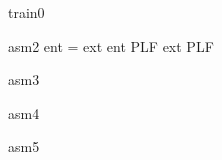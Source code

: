 \documentclass[12pt]{amsart}
\begin{document}
\begin{machine}{train0}
\begin{assumption}{asm2}
	\neg ent = ext \land \neg ent \in PLF \land \neg ext \in PLF
\end{assumption}

\begin{assumption}{asm3}
\end{assumption}

\begin{assumption}{asm4}
\end{assumption}

\begin{assumption}{asm5}
\end{assumption}

\end{machine}
\end{document}
